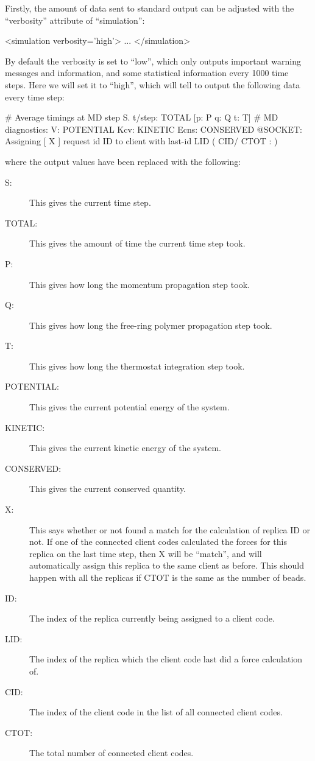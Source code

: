 \documentclass[11pt,english,fleqn]{report}
\newenvironment{code}{%
\footnotesize 
\verbatim
}{
\endverbatim
\normalsize
}
\begin{document}
Firstly, the amount of data sent to standard output can be adjusted
with the {}``verbosity'' attribute of {}``simulation'':

\begin{code}
<simulation verbosity='high'>
   ...
</simulation>
\end{code}

By default the verbosity is set to {}``low'', which only outputs
important warning messages and information, and some statistical 
information every 1000 time steps. Here we will set it to 
{}``high'', which will 
tell \ipi to output the following data every time step:

\begin{code}
 # Average timings at MD step S. t/step: TOTAL [p: P q: Q t: T]
 # MD diagnostics: V: POTENTIAL Kcv: KINETIC Ecns: CONSERVED
 @SOCKET: Assigning [ X ] request id ID to client with last-id LID ( CID/ CTOT : )
\end{code}
where the output values have been replaced with the following:
\begin{description}
\item [{S:}] This gives the current time step.
\item[{TOTAL:}] This gives the amount of time the current time step took.
\item [{P:}] This gives how long the momentum propagation step took.
\item [{Q:}] This gives how long the free-ring polymer propagation step took.
\item [{T:}] This gives how long the thermostat integration step took.
\item [{POTENTIAL:}] This gives the current potential energy of the system.
\item [{KINETIC:}] This gives the current kinetic energy of the system.
\item [{CONSERVED:}] This gives the current conserved quantity.
\item [{X:}] This says whether or not \ipi found a match for the calculation of 
replica ID or not.
If one of the connected client codes calculated the forces for this replica on the
last time step, then X will be {}``match'', and \ipi will automatically assign
this replica to the same client as before. This should happen with all the replicas
if CTOT is the same as the number of beads.
\item [{ID:}] The index of the replica currently being assigned to a client code.
\item [{LID:}] The index of the replica which the client code last did a force calculation
of.
\item [{CID:}] The index of the client code in the list of all connected client codes.
\item [{CTOT:}] The total number of connected client codes.
\end{description}
\end{document}
